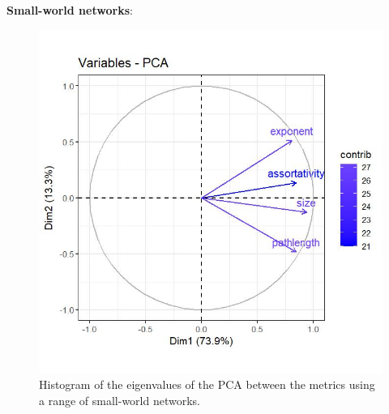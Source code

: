 \documentclass[
]{article}
\begin{document}
\textbf{Small-world networks}:

\begin{figure}[!H]

{\centering \includegraphics{./Figures/unnamed-chunk-86-1} 

}

\caption{Histogram of the eigenvalues of the PCA between the metrics using a range of small-world networks.}\label{fig:unnamed-chunk-86}
\end{figure}
\end{document}
